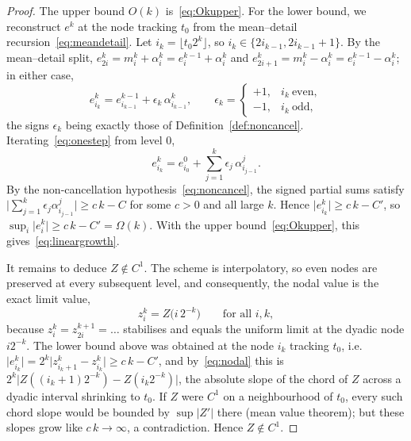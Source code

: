 \documentclass{article}
\theoremstyle{plain}
\theoremstyle{definition}
\newcommand{\abs}[1]{\lvert #1 \rvert}
\begin{document}
\begin{proof}
The upper bound $O(k)$ is~\eqref{eq:Okupper}. For the lower bound, we reconstruct
$e^k$ at the node tracking $t_0$ from the mean--detail
recursion~\eqref{eq:meandetail}. Let $i_k=\lfloor t_0 2^k\rfloor$, so
$i_k\in\{2i_{k-1},2i_{k-1}+1\}$. By the mean--detail split,
$e_{2i}^{k}=m_i^{k}+\alpha_i^{k}=e_i^{k-1}+\alpha_i^{k}$ and
$e_{2i+1}^{k}=m_i^{k}-\alpha_i^{k}=e_i^{k-1}-\alpha_i^{k}$; in either case,
\begin{equation}\label{eq:onestep}
  e_{i_k}^{k}=e_{i_{k-1}}^{k-1}+\epsilon_k\,\alpha_{i_{k-1}}^{k},
  \qquad \epsilon_k=\begin{cases}+1,& i_k\ \text{even},\\ -1,& i_k\ \text{odd},\end{cases}
\end{equation}
the signs $\epsilon_k$ being exactly those of Definition~\ref{def:noncancel}.
Iterating~\eqref{eq:onestep} from level $0$,
\[
  e_{i_k}^{k}=e_{i_0}^{0}+\sum_{j=1}^{k}\epsilon_j\,\alpha_{i_{j-1}}^{j}.
\]
By the non-cancellation hypothesis~\eqref{eq:noncancel}, the signed partial sums
satisfy $\bigl\lvert\sum_{j=1}^k\epsilon_j\alpha_{i_{j-1}}^j\bigr\rvert\ge c\,k-C$
for some $c>0$ and all large $k$. Hence $\abs{e_{i_k}^k}\ge c\,k-C'$, so
$\sup_i\abs{e_i^k}\ge c\,k-C'=\Omega(k)$. With the upper
bound~\eqref{eq:Okupper}, this gives~\eqref{eq:lineargrowth}.

It remains to deduce $Z\notin C^1$. The scheme is interpolatory, so even nodes
are preserved at every subsequent level, and consequently, the nodal value is the
exact limit value,
\begin{equation}\label{eq:nodal}
  z_i^k=Z\bigl(i\,2^{-k}\bigr)\qquad\text{for all }i,k,
\end{equation}
because $z_i^k=z_{2i}^{k+1}=\dots$ stabilises and equals the uniform limit at the
dyadic node $i2^{-k}$. The lower bound above was obtained at the node $i_k$
tracking $t_0$, i.e.\ $\abs{e_{i_k}^k}=2^k\abs{z_{i_k+1}^k-z_{i_k}^k}\ge c\,k-C'$,
and by~\eqref{eq:nodal} this is $2^k\abs{Z((i_k+1)2^{-k})-Z(i_k2^{-k})}$, the
absolute slope of the chord of $Z$ across a dyadic interval shrinking to $t_0$.
If $Z$ were $C^1$ on a neighbourhood of $t_0$, every such chord slope would be
bounded by $\sup\abs{Z'}$ there (mean value theorem); but these slopes grow like
$c\,k\to\infty$, a contradiction. Hence $Z\notin C^1$.
\end{proof}
\end{document}
